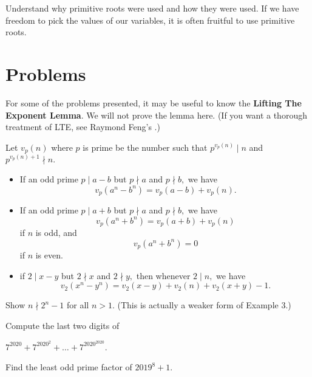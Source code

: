 \documentclass[mast]{lucky}
\begin{document}
Understand why primitive roots were used and how they were used. If we have freedom to pick the values of our variables, it is often fruitful to use primitive roots.

\pagebreak

\section{Problems}

For some of the problems presented, it may be useful to know the \textbf{Lifting The Exponent Lemma}. We will not prove the lemma here. (If you want a thorough treatment of LTE, see Raymond Feng's .)

\begin{theo}
Let $v_p(n)$ where $p$ is prime be the number such that $p^{v_p(n)} \mid n$ and $p ^{v_p(n)+1} \nmid n.$

\begin{itemize}
    \item If an odd prime $p \mid a-b$ but $p \nmid a$ and $p \nmid b,$ we have $$v_p(a^n - b^n) = v_p(a-b)+v_p(n).$$

    \item If an odd prime $p \mid a+b$ but $p \nmid a$ and $p \nmid b,$ we have $$v_p(a^n + b^n) = v_p(a+b)+v_p(n)$$ if $n$ is odd, and $$v_p(a^n + b^n) = 0$$ if $n$ is even.

    \item if $2 \mid x - y$ but $2 \nmid x$ and $2 \nmid y,$ then whenever $2 \mid n,$ we have $$v_2(x^n-y^n) = v_2(x-y)+v_2(n)+v_2(x+y)-1.$$
\end{itemize}
\end{theo}

\noindent{}


\begin{prob}[]{1}
Show $n \nmid 2^n-1$ for all $n>1.$ (This is actually a weaker form of Example 3.)
\end{prob}

\begin{prob}{1}
Compute the last two digits of

$7^{2020}+7^{2020^2}+\ldots +7^{2020^{2020}}$.
\end{prob}

\begin{prob}[AIME I 2019/14]{2}
Find the least odd prime factor of $2019^8+1$.
\end{prob}
\end{document}
